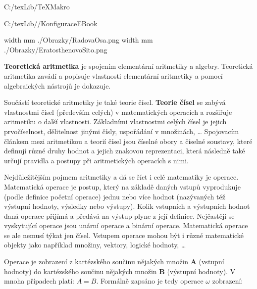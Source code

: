 

\def\addr{C:/texLib/}
%
%
%

 \addr TeXMakro
\setAddress{\addr}

 \addr/KonfiguraceEBook

\pdfximage width \the\SirkaOdstavce mm {./Obrazky/RadovaOsa.png}
\pdfximage width \the\SirkaOdstavce mm {./Obrazky/EratosthenovoSito.png}




\Obsah

{\bf Teoretická aritmetika} je spojením elementární aritmetiky a algebry. Teoretická aritmetika zavádí a popisuje vlastnosti elementární aritmetiky a pomocí algebraických nástrojů je dokazuje.

Součástí teoretické aritmetiky je také teorie čísel. {\bf Teorie čísel} se zabývá vlastnostmi čísel (především celých) v matematických operacích a rozšiřuje aritmetiku o další vlastnosti. Základními vlastnostmi celých čísel je jejich prvočíselnost, dělitelnost jinými čísly, uspořádání v množinách, …
Spojovacím článkem mezi aritmetikou a teorií čísel jsou číselné obory a číselné soustavy, které definují různé druhy hodnot a jejich znakovou reprezentaci, která následně také určují pravidla a postupy při aritmetických operacích s nimi.


Nejdůležitějším pojmem aritmetiky a dá se říct i celé matematiky je operace. Matematická operace je postup, který na základě daných vstupů vyprodukuje (podle definice početní operace) jednu nebo více hodnot (nazývaných též výstupní hodnoty, výsledky nebo výstupy). Kolik vstupních a výstupních hodnot daná operace přijímá a předává na výstup plyne z její definice. Nejčastěji se vyskytující operace jsou unární operace a binární operace. Matematická operace se ale nemusí týkat jen čísel. Vstupem operace mohou být i různé matematické objekty jako například množiny, vektory, logické hodnoty, …

Operace je zobrazení z kartézského součinu nějakých množin {\bf A} (vstupní hodnoty) do kartézského součinu nějakých množin {\bf B} (výstupní hodnoty). V mnoha případech platí: $A = B$. Formálně zapsáno je tedy operace $ \omega $ zobrazení:

